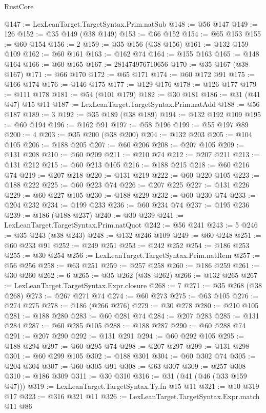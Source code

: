 \begin{lexlean}{RustCore}
\begin{coremodule}
@147 := LexLeanTarget.TargetSyntax.Prim.natSub
@148 := @56 @147
@149 := 126
@152 := @35 @149 (@38 @149)
@153 := @66 @152
@154 := @65 @153
@155 := @60 @154
@156 := 2
@159 := @35 @156 (@38 @156)
@161 := @132 @159 @109
@162 := @60 @161
@163 := @162 @74
@164 := @155 @163
@165 := @148 @164
@166 := @60 @165
@167 := 281474976710656
@170 := @35 @167 (@38 @167)
@171 := @66 @170
@172 := @65 @171
@174 := @60 @172 @91
@175 := @166 @174
@176 := @146 @175
@177 := @129 @176
@178 := @126 @177
@179 := @111 @178
@181 := @54 (@101 @179)
@182 := @30 @181
@186 := @31 (@41 @47) @15 @11
@187 := LexLeanTarget.TargetSyntax.Prim.natAdd
@188 := @56 @187
@189 := 3
@192 := @35 @189 (@38 @189)
@194 := @132 @192 @109
@195 := @60 @194
@196 := @162 @91
@197 := @58 @196
@199 := @55 @197 @89
@200 := 4
@203 := @35 @200 (@38 @200)
@204 := @132 @203
@205 := @104 @105
@206 := @188 @205
@207 := @60 @206
@208 := @207 @105
@209 := @131 @208
@210 := @60 @209
@211 := @210 @74
@212 := @207 @211
@213 := @131 @212
@215 := @60 @213 @105
@216 := @188 @215
@218 := @60 @216 @74
@219 := @207 @218
@220 := @131 @219
@222 := @60 @220 @105
@223 := @188 @222
@225 := @60 @223 @74
@226 := @207 @225
@227 := @131 @226
@229 := @60 @227 @105
@230 := @188 @229
@232 := @60 @230 @74
@233 := @204 @232
@234 := @199 @233
@236 := @60 @234 @74
@237 := @195 @236
@239 := @186 (@188 @237)
@240 := @30 @239
@241 := LexLeanTarget.TargetSyntax.Prim.natQuot
@242 := @56 @241
@243 := 5
@246 := @35 @243 (@38 @243)
@248 := @132 @246 @109
@249 := @60 @248
@251 := @60 @233 @91
@252 := @249 @251
@253 := @242 @252
@254 := @186 @253
@255 := @30 @254
@256 := LexLeanTarget.TargetSyntax.Prim.natRem
@257 := @56 @256
@258 := @63 @251
@259 := @257 @258
@260 := @186 @259
@261 := @30 @260
@262 := 6
@265 := @35 @262 (@38 @262)
@266 := @132 @265
@267 := LexLeanTarget.TargetSyntax.Expr.closure
@268 := 7
@271 := @35 @268 (@38 @268)
@273 := @267 @271 @74
@274 := @60 @273
@275 := @63 @105
@276 := @274 @275
@278 := @186 (@266 @276)
@279 := @30 @278
@280 := @210 @105
@281 := @188 @280
@283 := @60 @281 @74
@284 := @207 @283
@285 := @131 @284
@287 := @60 @285 @105
@288 := @188 @287
@290 := @60 @288 @74
@291 := @207 @290
@292 := @131 @291
@294 := @60 @292 @105
@295 := @188 @294
@297 := @60 @295 @74
@298 := @207 @297
@299 := @131 @298
@301 := @60 @299 @105
@302 := @188 @301
@304 := @60 @302 @74
@305 := @204 @304
@307 := @60 @305 @91
@308 := @63 @307
@309 := @257 @308
@310 := @186 @309
@311 := @30 @310
@316 := @31 (@41 (@46 (@33 @159 @47)))
@319 := LexLeanTarget.TargetSyntax.Ty.fn @15 @11
@321 := @10 @319 @17
@323 := @316 @321 @11
@326 := LexLeanTarget.TargetSyntax.Expr.match @11 @86

\end{coremodule}
\end{lexlean}
